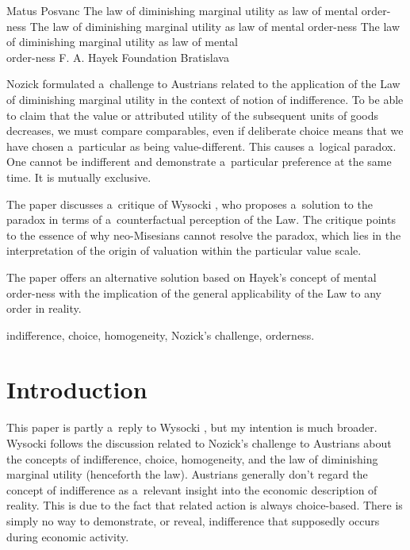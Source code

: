 \begin{artengenv}{Matus Posvanc}
	{The law of diminishing marginal utility as law of mental order-ness}
	{The law of diminishing marginal utility as law of mental order-ness}
	{The law of diminishing marginal utility as law of mental\\order-ness}
	{F. A. Hayek Foundation Bratislava}
	{Nozick 
	\parencite*[][]{Nozick1977On} %
	 formulated a~challenge to Austrians related to the application of the Law of diminishing marginal utility in the context of notion of indifference. To be able to claim that the value or attributed utility of the subsequent units of goods decreases, we must compare comparables, even if deliberate choice means that we have chosen a~particular as being value-different. This causes a~logical paradox. One cannot be indifferent and demonstrate a~particular preference at the same time. It is mutually exclusive.
	 
	 The paper discusses a~critique of Wysocki 
	 \parencite*[][]{Wysocki2021problem}, %
	  who proposes a~solution to the paradox in terms of a~counterfactual perception of the Law. The critique points to the essence of why neo-Misesians cannot resolve the paradox, which lies in the interpretation of the origin of valuation within the particular value scale. 
	 
	 The paper offers an alternative solution based on Hayek's concept of mental order-ness with the implication of the general applicability of the Law to any order in reality.
	}
	{indifference, choice, homogeneity, Nozick's challenge, orderness.}



\renewcommand{\figurename}{Illustration}

\section{Introduction}



\lettrine[loversize=0.13,lines=2,lraise=-0.03,nindent=0em,findent=0.2pt]%
{T}{}his paper is partly a~reply to Wysocki 
\parencite*[][]{Wysocki2021problem}, %
 but my intention is much broader. Wysocki follows the discussion related to Nozick's 
\parencite*[][]{Nozick1977On} %
 challenge to Austrians about the concepts of indifference, choice, homogeneity, and the law of diminishing marginal utility (henceforth the law). Austrians generally don't regard the concept of indifference as a~relevant insight into the economic description of reality. This is due to the fact that related action is always choice-based. There is simply no way to demonstrate, or reveal, indifference that supposedly occurs during economic activity.




\end{artengenv}
